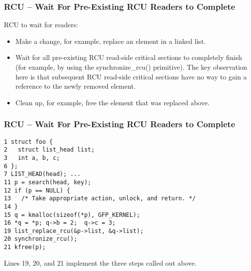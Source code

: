 \begin{frame}[fragile]
    \frametitle{RCU -- Wait For Pre-Existing RCU Readers to Complete}
    \Large
RCU to wait for readers: 
\begin{itemize}
    \item  Make a change, for example, replace an element in a linked list. 
    \item  Wait for all pre-existing RCU read-side critical sections to completely finish (for example, by using the synchronize\_rcu() primitive). The key observation here is that subsequent RCU read-side critical sections have no way to gain a reference to the newly removed element. 
    \item Clean up, for example, free the element that was replaced above.  
\end{itemize}
\end{frame}


\begin{frame}[fragile]
    \frametitle{RCU -- Wait For Pre-Existing RCU Readers to Complete}
    
    \small
    \begin{block}{}
        \begin{verbatim}
1 struct foo {
2   struct list_head list;
3   int a, b, c;
6 };
7 LIST_HEAD(head); ...
11 p = search(head, key);
12 if (p == NULL) {
13   /* Take appropriate action, unlock, and return. */
14 }
15 q = kmalloc(sizeof(*p), GFP_KERNEL);
16 *q = *p; q->b = 2;  q->c = 3;
19 list_replace_rcu(&p->list, &q->list);
20 synchronize_rcu();
21 kfree(p);
\end{verbatim}
\end{block}  
\large
Lines 19, 20, and 21 implement the three steps called out above.
\end{frame}

